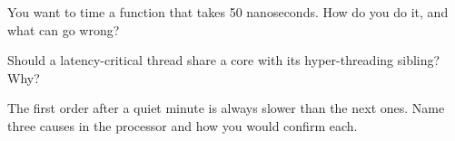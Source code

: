 \begin{interviewq}\label{iq:ll:cpu-microarchitecture:4}
You want to time a function that takes 50 nanoseconds. How do you do it, and what can go wrong?
\end{interviewq}

\begin{interviewq}\label{iq:ll:cpu-microarchitecture:5}
Should a latency-critical thread share a core with its hyper-threading sibling? Why?
\end{interviewq}

\begin{interviewq}\label{iq:ll:cpu-microarchitecture:6}
The first order after a quiet minute is always slower than the next ones. Name three causes in the processor and how
you would confirm each.
\end{interviewq}
